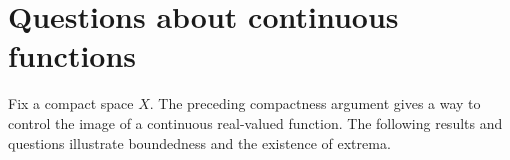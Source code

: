 \chapter{Questions about continuous functions}
\label{chap:continuous-functions}
Fix a compact space $X$. The preceding compactness argument gives a way to control the image of a continuous real-valued function. The following results and questions illustrate boundedness and the existence of extrema.
